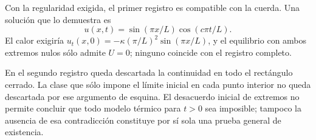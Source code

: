 Con la regularidad exigida, el primer registro es compatible con la cuerda. Una solución que lo demuestra es
\[
u(x,t)=\sin(\pi x/L)\cos(c\pi t/L).
\]
El calor exigiría \(u_t(x,0)=-\kappa(\pi/L)^2\sin(\pi x/L)\), y el equilibrio con ambos extremos nulos sólo admite \(U=0\); ninguno coincide con el registro completo.

En el segundo registro queda descartada la continuidad en todo el rectángulo cerrado. La clase que sólo impone el límite inicial en cada punto interior no queda descartada por ese argumento de esquina. El desacuerdo inicial de extremos no permite concluir que todo modelo térmico para \(t>0\) sea imposible; tampoco la ausencia de esa contradicción constituye por sí sola una prueba general de existencia.
